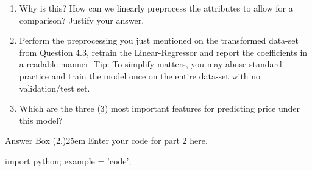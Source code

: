 \documentclass[12pt]{article}
\begin{document}
\begin{enumerate}
    \item[1] [Text] Why is this? How can we linearly preprocess the attributes to allow for a comparison? Justify your answer.
    \item[2] [Code] Perform the preprocessing you just mentioned on the transformed data-set from Question 4.3, retrain the Linear-Regressor and report the coefficients in a readable manner. Tip: To simplify matters, you may abuse standard practice and train the model once on the entire data-set with no validation/test set.
    \item[3] [Text] Which are the three (3) most important features for predicting price under this model?
\end{enumerate}



\begin{code}{Answer Box (2.)}{25em}
    Enter your code for part 2 here.

    import python;
    example = 'code';
\end{code}




\end{document}
